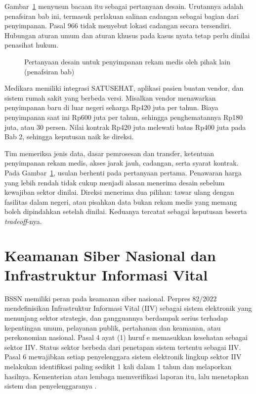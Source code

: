 Gambar~\ref{fig:ch03-lokasi-data} menyusun bacaan itu sebagai pertanyaan desain. Urutannya adalah
penafsiran bab ini, termasuk perlakuan salinan cadangan sebagai bagian dari penyimpanan. Pasal 966
tidak menyebut lokasi cadangan secara tersendiri. Hubungan aturan umum dan aturan khusus pada kasus
nyata tetap perlu dinilai penasihat hukum.

\begin{figure}[!htb]
  \centering
  
  \caption{Pertanyaan desain untuk penyimpanan rekam medis oleh pihak lain (penafsiran bab)}
  \label{fig:ch03-lokasi-data}
\end{figure}

\begin{kasus}[title={Kasus Medikara Health: Satu Data, Beberapa Lapis Kewajiban}]
Medikara memiliki integrasi SATUSEHAT, aplikasi pasien buatan vendor, dan sistem rumah sakit yang
berbeda versi. Misalkan vendor menawarkan penyimpanan baru di luar negeri seharga Rp420 juta per
tahun. Biaya penyimpanan saat ini Rp600 juta per tahun, sehingga penghematannya Rp180 juta, atau
30 persen. Nilai kontrak Rp420 juta melewati batas Rp400 juta pada Bab 2, sehingga keputusan naik
ke direksi.

Tim memeriksa jenis data, dasar pemrosesan dan transfer, ketentuan penyimpanan rekam medis, akses
jarak jauh, cadangan, serta syarat kontrak. Pada Gambar~\ref{fig:ch03-lokasi-data}, usulan berhenti
pada pertanyaan pertama. Penawaran harga yang lebih rendah tidak cukup menjadi alasan menerima
desain sebelum kewajiban sektor dinilai. Direksi menerima dua pilihan: tawar ulang dengan fasilitas
dalam negeri, atau pisahkan data bukan rekam medis yang memang boleh dipindahkan setelah dinilai.
Keduanya tercatat sebagai keputusan beserta \textit{tradeoff}-nya.
\end{kasus}

\section{Keamanan Siber Nasional dan Infrastruktur Informasi Vital}

BSSN memiliki peran pada keamanan siber nasional. Perpres 82/2022 mendefinisikan Infrastruktur
Informasi Vital (IIV) sebagai sistem elektronik yang menunjang sektor strategis, dan gangguannya
berdampak serius terhadap kepentingan umum, pelayanan publik, pertahanan dan keamanan, atau
perekonomian nasional. Pasal 4 ayat (1) huruf e memasukkan kesehatan sebagai sektor IIV. Status
sektor berbeda dari penetapan sistem tertentu sebagai IIV. Pasal 6 mewajibkan setiap penyelenggara
sistem elektronik lingkup sektor IIV melakukan identifikasi paling sedikit 1 kali dalam 1 tahun dan
melaporkan hasilnya. Kementerian atau lembaga memverifikasi laporan itu, lalu menetapkan sistem dan
penyelenggaranya \cite{perpres82-2022-iiv}.


